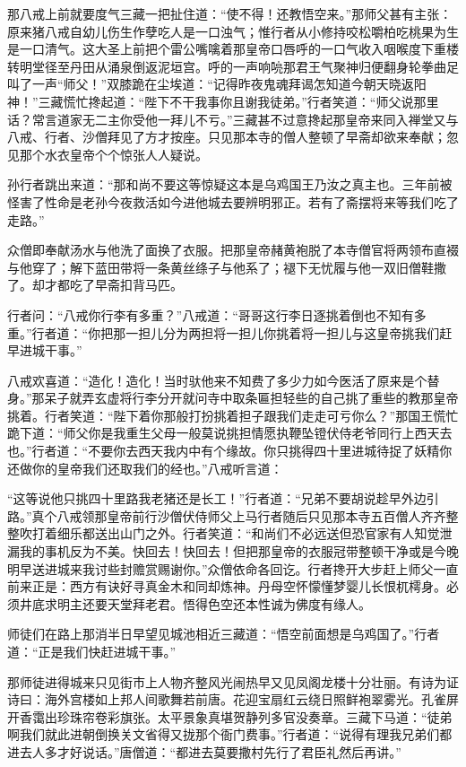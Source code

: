 \documentclass[12pt,UTF8]{ctexbook}
\begin{document}
那八戒上前就要度气三藏一把扯住道：“使不得！还教悟空来。”那师父甚有主张：原来猪八戒自幼儿伤生作孽吃人是一口浊气；惟行者从小修持咬松嚼柏吃桃果为生是一口清气。这大圣上前把个雷公嘴噙着那皇帝口唇呼的一口气收入咽喉度下重楼转明堂径至丹田从涌泉倒返泥垣宫。呼的一声响喨那君王气聚神归便翻身轮拳曲足叫了一声“师父！”双膝跪在尘埃道：“记得昨夜鬼魂拜谒怎知道今朝天晓返阳神！”三藏慌忙搀起道：“陛下不干我事你且谢我徒弟。”行者笑道：“师父说那里话？常言道家无二主你受他一拜儿不亏。”三藏甚不过意搀起那皇帝来同入禅堂又与八戒、行者、沙僧拜见了方才按座。只见那本寺的僧人整顿了早斋却欲来奉献；忽见那个水衣皇帝个个惊张人人疑说。

孙行者跳出来道：“那和尚不要这等惊疑这本是乌鸡国王乃汝之真主也。三年前被怪害了性命是老孙今夜救活如今进他城去要辨明邪正。若有了斋摆将来等我们吃了走路。”

众僧即奉献汤水与他洗了面换了衣服。把那皇帝赭黄袍脱了本寺僧官将两领布直裰与他穿了；解下蓝田带将一条黄丝绦子与他系了；褪下无忧履与他一双旧僧鞋撒了。却才都吃了早斋扣背马匹。

行者问：“八戒你行李有多重？”八戒道：“哥哥这行李日逐挑着倒也不知有多重。”行者道：“你把那一担儿分为两担将一担儿你挑着将一担儿与这皇帝挑我们赶早进城干事。”

八戒欢喜道：“造化！造化！当时驮他来不知费了多少力如今医活了原来是个替身。”那呆子就弄玄虚将行李分开就问寺中取条匾担轻些的自己挑了重些的教那皇帝挑着。行者笑道：“陛下着你那般打扮挑着担子跟我们走走可亏你么？”那国王慌忙跪下道：“师父你是我重生父母一般莫说挑担情愿执鞭坠镫伏侍老爷同行上西天去也。”行者道：“不要你去西天我内中有个缘故。你只挑得四十里进城待捉了妖精你还做你的皇帝我们还取我们的经也。”八戒听言道：

“这等说他只挑四十里路我老猪还是长工！”行者道：“兄弟不要胡说趁早外边引路。”真个八戒领那皇帝前行沙僧伏侍师父上马行者随后只见那本寺五百僧人齐齐整整吹打着细乐都送出山门之外。行者笑道：“和尚们不必远送但恐官家有人知觉泄漏我的事机反为不美。快回去！快回去！但把那皇帝的衣服冠带整顿干净或是今晚明早送进城来我讨些封赡赏赐谢你。”众僧依命各回讫。行者搀开大步赶上师父一直前来正是：西方有诀好寻真金木和同却炼神。丹母空怀懞懂梦婴儿长恨杌樗身。必须井底求明主还要天堂拜老君。悟得色空还本性诚为佛度有缘人。

师徒们在路上那消半日早望见城池相近三藏道：“悟空前面想是乌鸡国了。”行者道：“正是我们快赶进城干事。”

那师徒进得城来只见街市上人物齐整风光闹热早又见凤阁龙楼十分壮丽。有诗为证诗曰：海外宫楼如上邦人间歌舞若前唐。花迎宝扇红云绕日照鲜袍翠雾光。孔雀屏开香霭出珍珠帘卷彩旗张。太平景象真堪贺静列多官没奏章。三藏下马道：“徒弟啊我们就此进朝倒换关文省得又拢那个衙门费事。”行者道：“说得有理我兄弟们都进去人多才好说话。”唐僧道：“都进去莫要撒村先行了君臣礼然后再讲。”
\end{document}
